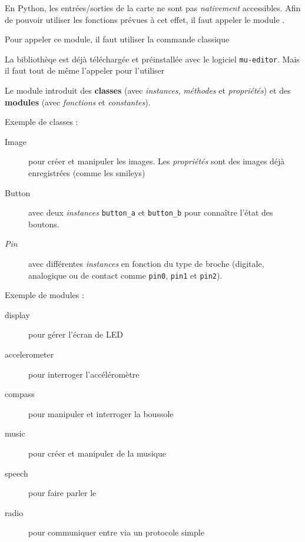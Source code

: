 En Python, les entrées/sorties de la carte \mb ne sont pas \textit{nativement} accessibles. Afin de pouvoir utiliser les fonctions prévues à cet effet, il faut appeler le module .\par
Pour appeler ce module, il faut utiliser la commande classique 
    
    
\begin{methode}
\end{methode}

\begin{astuce}
La bibliothèqe  est déjà téléchargée et préinstallée avec le logiciel \texttt{mu-editor}. Mais il faut tout de même l'appeler pour l'utiliser
\end{astuce}

Le module  introduit des \textbf{classes} (avec \emph{instances}, \emph{méthodes} et \emph{propriétés}) et des \textbf{modules} (avec \emph{fonctions} et  \emph{constantes}).

\begin{minipage}[t]{0.5\linewidth}
    Exemple de classes :
    \begin{description}
        \item[Image] pour créer et manipuler les images. Les \emph{propriétés} sont des images déjà enregistrées (comme les smileys)
        \item[Button] avec deux \emph{instances} \texttt{button\_a} et \texttt{button\_b} pour connaître l'état des boutons. 
        \item[\textit{Pin}] avec différentes \emph{instances} en fonction du type de broche (digitale, analogique ou de contact comme \texttt{pin0},  \texttt{pin1} et  \texttt{pin2}).
    \end{description}
\end{minipage}
%
\begin{minipage}[t]{0.5\linewidth}
    Exemple de modules :
    \begin{description}
        \item[display] pour gérer l'écran de LED
        \item[accelerometer] pour interroger l'accéléromètre
        \item[compass] pour manipuler et interroger la boussole
        \item[music] pour créer et manipuler de la musique
        \item[speech] pour faire parler le \mb
        \item[radio] pour communiquer entre \mb via un protocole simple
    \end{description}
\end{minipage}

